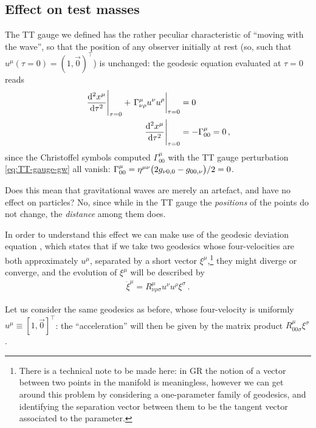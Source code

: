 \documentclass[main.tex]{subfiles}
\begin{document}
\subsection{Effect on test masses}

The \ac{TT} gauge we defined has the rather peculiar characteristic of ``moving with the wave'', so that the position of any observer initially at rest (so, such that \(u^{\mu } (\tau = 0 ) = (1, \vec{0})^{\top}\)) is unchanged: the geodesic equation evaluated at \(\tau = 0\) reads
%
\begin{subequations}
\begin{align}
\eval{\dv[2]{x^{\mu }}{\tau}}_{\tau = 0} + \eval{\Gamma^{\mu }_{\nu \rho } u^{\nu } u^{\rho }}_{\tau = 0} &= 0   \\
\eval{\dv[2]{x^{\mu }}{\tau}}_{\tau = 0} &= - \Gamma^{\mu }_{00} = 0 
\,,
\end{align}
\end{subequations}
%
since the Christoffel symbols computed \(\Gamma^{\mu }_{00}\) with the \ac{TT} gauge perturbation \eqref{eq:TT-gauge-gw} all vanish: \(\Gamma^{\mu }_{00} = \eta^{\mu \nu } \qty( 2 g_{\nu 0,0} - g_{00, \nu }) / 2 =  0\).

Does this mean that gravitational waves are merely an artefact, and have no effect on particles? 
No, since while in the \ac{TT} gauge the \emph{positions} of the points do not change, the \emph{distance} among them does.

In order to understand this effect we can make use of the geodesic deviation equation \cite[section 3.10]{carrollSpacetimeGeometryIntroduction2019}, which states that if we take two geodesics whose four-velocities are both approximately \(u^{\mu }\), separated by a short vector \(\xi ^{\mu }\),\footnote{There is a technical note to be made here: in GR the notion of a vector between two points in the manifold is meaningless, however we can get around this problem by considering a one-parameter family of geodesics, and identifying the separation vector between them to be the tangent vector associated to the parameter.} they might diverge or converge, and the evolution of \(\xi^{\mu }\) will be described by
%
\begin{align}
\ddot{\xi}^{\mu } = R^{\mu }_{\nu \rho \sigma } u^{\nu } u^{\rho } \xi^{\sigma }
\,.
\end{align}

Let us consider the same geodesics as before, whose four-velocity is uniformly \(u^{\mu } \equiv [1, \vec{0}]^{\top}\): the ``acceleration'' will then be given by the matrix product \(R^{\mu }_{00\sigma } \xi^{\sigma }\). 
\end{document}
